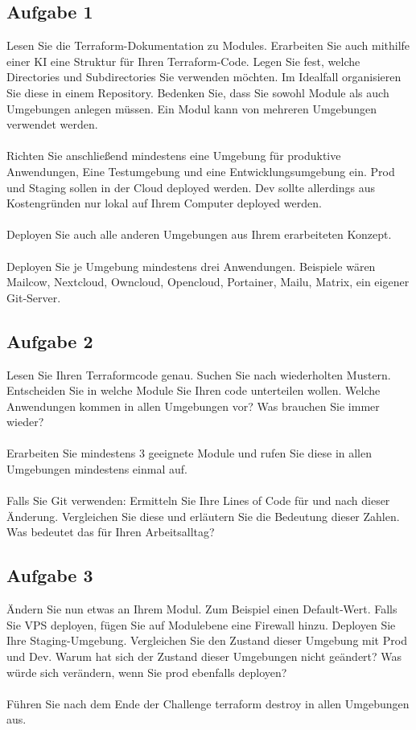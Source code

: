 \documentclass{article}
\begin{document}
    \subsection{Aufgabe 1}
        Lesen Sie die Terraform-Dokumentation zu Modules. Erarbeiten Sie auch mithilfe einer KI eine Struktur für Ihren Terraform-Code.
        Legen Sie fest, welche Directories und Subdirectories Sie verwenden möchten. Im Idealfall organisieren Sie diese in einem Repository.
        Bedenken Sie, dass Sie sowohl Module als auch Umgebungen anlegen müssen. Ein Modul kann von mehreren Umgebungen verwendet werden. \\ \\
        Richten Sie anschließend mindestens eine Umgebung für produktive Anwendungen, Eine Testumgebung und eine Entwicklungsumgebung ein.
        Prod und Staging sollen in der Cloud deployed werden. Dev sollte allerdings aus Kostengründen nur lokal auf Ihrem Computer deployed werden. \\ \\
        Deployen Sie auch alle anderen Umgebungen aus Ihrem erarbeiteten Konzept. \\ \\
        Deployen Sie je Umgebung mindestens drei Anwendungen. Beispiele wären Mailcow, Nextcloud, Owncloud, Opencloud, Portainer, Mailu, Matrix, ein eigener Git‑Server.

    \subsection{Aufgabe 2}
        Lesen Sie Ihren Terraformcode genau. Suchen Sie nach wiederholten Mustern. Entscheiden Sie in welche Module Sie Ihren code unterteilen wollen. Welche Anwendungen kommen in allen Umgebungen vor?
        Was brauchen Sie immer wieder? \\ \\
        Erarbeiten Sie mindestens 3 geeignete Module und rufen Sie diese in allen Umgebungen mindestens einmal auf. \\ \\
        Falls Sie Git verwenden: Ermitteln Sie Ihre Lines of Code für und nach dieser Änderung. Vergleichen Sie diese und erläutern Sie die Bedeutung dieser Zahlen.
        Was bedeutet das für Ihren Arbeitsalltag?

    \subsection{Aufgabe 3}
        Ändern Sie nun etwas an Ihrem Modul. Zum Beispiel einen Default‑Wert. Falls Sie VPS deployen, fügen Sie auf Modulebene eine Firewall hinzu.
        Deployen Sie Ihre Staging-Umgebung. Vergleichen Sie den Zustand dieser Umgebung mit Prod und Dev. Warum hat sich der Zustand dieser Umgebungen nicht geändert?
        Was würde sich verändern, wenn Sie prod ebenfalls deployen? \\ \\
        Führen Sie nach dem Ende der Challenge terraform destroy in allen Umgebungen aus.
\end{document}

